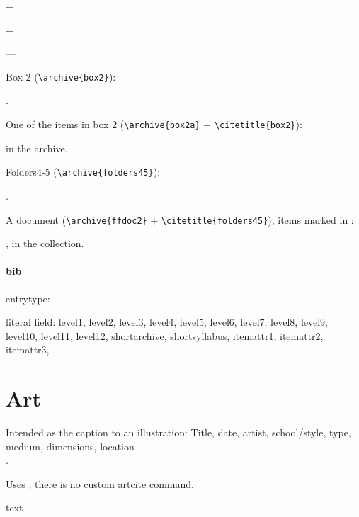  = 

 = 

---

Box 2 (\verb|\archive{box2}|): \par{}.

\medskip
One of the items in box 2 (\verb|\archive{box2a}| + \verb|\citetitle{box2}|): \par{} in the  archive.

\medskip
Folders4-5 (\verb|\archive{folders45}|): \par{}.

\medskip
A document (\verb|\archive{ffdoc2}| + \verb|\citetitle{folders45}|), items marked in \cmmhlcolour: \par
{}, 
in the 
collection.



\paragraph{bib}

entrytype: 

literal field: level1,
  level2,
  level3,
  level4,
  level5,
  level6,
  level7,
  level8,
  level9,
  level10,
  level11,
  level12,
  shortarchive,
  shortsyllabus,
  itemattr1,
  itemattr2,
  itemattr3,


\ddivider







\section{Art}
Intended as the caption to an illustration: Title, date, artist, school/style, type, medium, dimensions, location -- \\{\color{blue}}.

Uses ; there is no custom artcite command.




text
